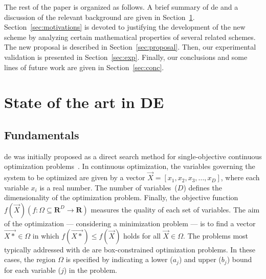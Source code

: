 \documentclass[review,3p]{elsarticle}
\newcommand{\DE}{{\sc de}}
\begin{document}
The rest of the paper is organized as follows.
%
A brief summary of \DE{} and a discussion of the relevant background are given in Section~\ref{sec:state_de}.
%
Section~\ref{sec:motivations} is devoted to justifying the development of the new scheme by analyzing certain mathematical properties
of several related schemes.
%
The new proposal is described in Section~\ref{sec:proposal}.
%
Then, our experimental validation is presented in Section~\ref{sec:exp}.
%
Finally, our conclusions and some lines of future work are given in Section~\ref{sec:conc}.

\section{State of the art in DE}
\label{sec:state_de}

\subsection{Fundamentals}

\DE{} was initially proposed as a direct search method for single-objective
continuous optimization problems~\cite{Storn:97}.
%
In continuous optimization, the variables governing the system to be optimized are given by a vector
$\vec{X} = [x_{1}, x_{2}, x_{3}, ..., x_{D}]$, where each variable $x_{i}$ is a real number.
%
The number of variables~($D$) defines the dimensionality of the optimization problem.
%
Finally, the objective function $f(\vec{X})(f:\Omega \subseteq \mathbf{R}^{D} \to \mathbf{R})$ measures the quality of each set of variables.
%
The aim of the optimization --- considering a minimization problem --- is to find a vector
$\vec{X*} \in \Omega$ in which $f(\vec{X*}) \leq f(\vec{X})$ holds for all $\vec{X} \in \Omega$.
%
The problems most typically addressed with \DE{} are box-constrained optimization problems.
%
In these cases, the region $\Omega$ is specified by indicating a lower ($a_j$) and
upper ($b_j$) bound for each variable ($j$) in the problem.
%
\end{document}
